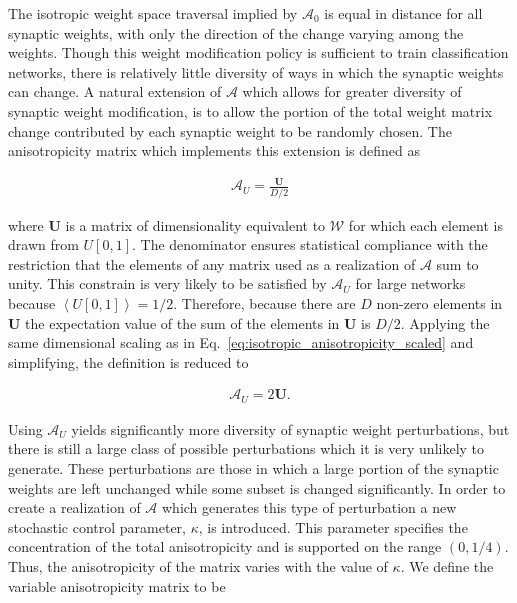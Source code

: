 \documentclass[11pt]{afthesis}
\begin{document}
	The isotropic weight space traversal implied by $\boldsymbol{\mathcal{A}}_0$ is equal in distance for all synaptic weights, with only the direction of the change varying among the weights. Though this weight modification policy is sufficient to train classification networks, there is relatively little diversity of ways in which the synaptic weights can change. A natural extension of $\boldsymbol{\mathcal{A}}$ which allows for greater diversity of synaptic weight modification, is to allow the portion of the total weight matrix change contributed by each synaptic weight to be randomly chosen. The anisotropicity matrix which implements this extension is defined as
	
	\begin{align}
	\boldsymbol{\mathcal{A}}_U =  \frac{\boldsymbol{U}}{D/2}
	\end{align}
	
	\noindent where $\boldsymbol{U}$ is a matrix of dimensionality equivalent to $\boldsymbol{\mathcal{W}}$ for which each element is drawn from $U[0,1]$.  The denominator ensures statistical compliance with the restriction that the elements of any matrix used as a realization of $\boldsymbol{\mathcal{A}}$ sum to unity. This constrain is very likely to be satisfied by $\boldsymbol{\mathcal{A}}_U$ for large networks because $\left\langle  U[0,1] \right\rangle =1/2$. Therefore, because there are $D$ non-zero elements in $\boldsymbol{U}$ the expectation value of the sum of the elements in $\boldsymbol{U}$ is $D/2$. Applying the same dimensional scaling as in Eq.~\ref{eq:isotropic_anisotropicity_scaled} and simplifying, the definition is reduced to
	
	\begin{align}
	\boldsymbol{\mathcal{A}}_U =  2 \boldsymbol{U}.
	\label{eq:uniform_anisotropicity}
	\end{align}
	
	Using $\boldsymbol{\mathcal{A}}_U$ yields significantly more diversity of synaptic weight perturbations, but there is still a large class of possible perturbations which it is very unlikely to generate. These perturbations are those in which a large portion of the synaptic weights are left unchanged while some subset is changed significantly. In order to create a realization of $\boldsymbol{\mathcal{A}}$ which generates this type of perturbation a new stochastic control parameter, $\kappa$, is introduced. This parameter specifies the concentration of the total anisotropicity and is supported on the range $(0, 1/4)$. Thus, the anisotropicity of the matrix varies with the value of  $\kappa$. We define the variable anisotropicity matrix to be
	
\end{document}
